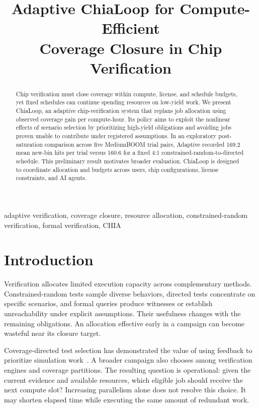 \documentclass[conference,letterpaper]{IEEEtran}
\begin{document}
\title{Adaptive ChiaLoop for Compute-Efficient\\
Coverage Closure in Chip Verification}
\author{
}
\maketitle

\begin{abstract}
Chip verification must close coverage within compute, license, and schedule budgets, yet fixed schedules can continue spending resources on low-yield work. We present ChiaLoop, an adaptive chip-verification system that replans job allocation using observed coverage gain per compute-hour. Its policy aims to exploit the nonlinear effects of scenario selection by prioritizing high-yield obligations and avoiding jobs proven unable to contribute under registered assumptions. In an exploratory post-saturation comparison across five MediumBOOM trial pairs, Adaptive recorded 169.2 mean new-bin hits per trial versus 160.6 for a fixed 4:1 constrained-random-to-directed schedule. This preliminary result motivates broader evaluation. ChiaLoop is designed to coordinate allocation and budgets across users, chip configurations, license constraints, and AI agents.
\end{abstract}

\begin{IEEEkeywords}
adaptive verification, coverage closure, resource allocation, constrained-random verification, formal verification, CHIA
\end{IEEEkeywords}

\section{Introduction}
Verification allocates limited execution capacity across complementary methods. Constrained-random tests sample diverse behaviors, directed tests concentrate on specific scenarios, and formal queries produce witnesses or establish unreachability under explicit assumptions. Their usefulness changes with the remaining obligations. An allocation effective early in a campaign can become wasteful near its closure target.

Coverage-directed test selection has demonstrated the value of using feedback to prioritize simulation work~\cite{masamba}. A broader campaign also chooses among verification engines and coverage partitions. The resulting question is operational: given the current evidence and available resources, which eligible job should receive the next compute slot? Increasing parallelism alone does not resolve this choice. It may shorten elapsed time while executing the same amount of redundant work.
\end{document}

